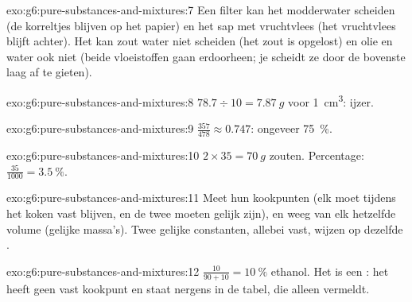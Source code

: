 \begin{solution}{exo:g6:pure-substances-and-mixtures:7}
Een filter kan het modderwater scheiden (de korreltjes blijven op het
papier) en het sap met vruchtvlees (het vruchtvlees blijft achter). Het
kan zout water niet scheiden (het zout is opgelost) en olie en water ook
niet (beide vloeistoffen gaan erdoorheen; je scheidt ze door de
bovenste laag af te gieten).
\end{solution}

\begin{solution}{exo:g6:pure-substances-and-mixtures:8}
$78.7 \div 10 = \qty{7.87}{g}$ voor \qty{1}{cm^3}: ijzer.
\end{solution}

\begin{solution}{exo:g6:pure-substances-and-mixtures:9}
$\frac{357}{478} \approx 0.747$: ongeveer \qty{75}{\percent}.
\end{solution}

\begin{solution}{exo:g6:pure-substances-and-mixtures:10}
$2 \times 35 = \qty{70}{g}$ zouten. Percentage: $\frac{35}{1000} =
\qty{3.5}{\percent}$.
\end{solution}

\begin{solution}{exo:g6:pure-substances-and-mixtures:11}
Meet hun kookpunten (elk moet tijdens het koken vast blijven, en de twee
moeten gelijk zijn), en weeg van elk hetzelfde volume (gelijke massa's).
Twee gelijke constanten, allebei vast, wijzen op dezelfde .
\end{solution}

\begin{solution}{exo:g6:pure-substances-and-mixtures:12}
$\frac{10}{90 + 10} = \qty{10}{\percent}$ ethanol. Het is een :
het heeft geen vast kookpunt en staat nergens in de tabel, die alleen
 vermeldt.
\end{solution}

